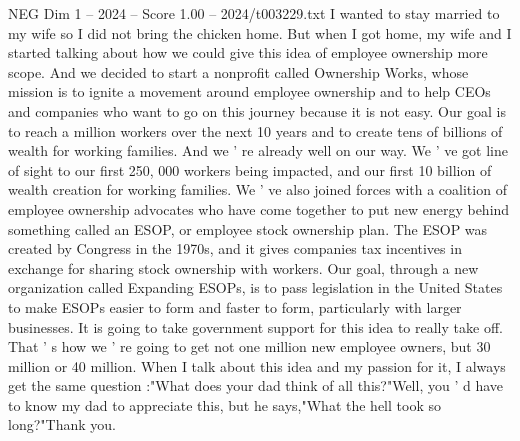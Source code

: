 \begin{textsample}{NEG Dim 1 – 2024 – Score 1.00 – 2024/t003229.txt}
I wanted to stay married to my wife so I did not bring the chicken home.
But when I got home, my wife and I started talking about how we could give this idea of employee ownership more scope.
And we decided to start a nonprofit called Ownership Works, whose mission is to ignite a movement around employee ownership and to help CEOs and companies who want to go on this journey because it is not easy.
Our goal is to reach a million workers over the next 10 years and to create tens of billions of wealth for working families.
And we ' re already well on our way.
We ' ve got line of sight to our first 250, 000 workers being impacted, and our first 10 billion of wealth creation for working families.
We ' ve also joined forces with a coalition of employee ownership advocates who have come together to put new energy behind something called an ESOP, or employee stock ownership plan.
The ESOP was created by Congress in the 1970s, and it gives companies tax incentives in exchange for sharing stock ownership with workers.
Our goal, through a new organization called Expanding ESOPs, is to pass legislation in the United States to make ESOPs easier to form and faster to form, particularly with larger businesses.
It is going to take government support for this idea to really take off.
That ' s how we ' re going to get not one million new employee owners, but 30 million or 40 million.
When I talk about this idea and my passion for it, I always get the same question :"What does your dad think of all this?"Well, you ' d have to know my dad to appreciate this, but he says,"What the hell took so long?"Thank you.

\end{textsample}
